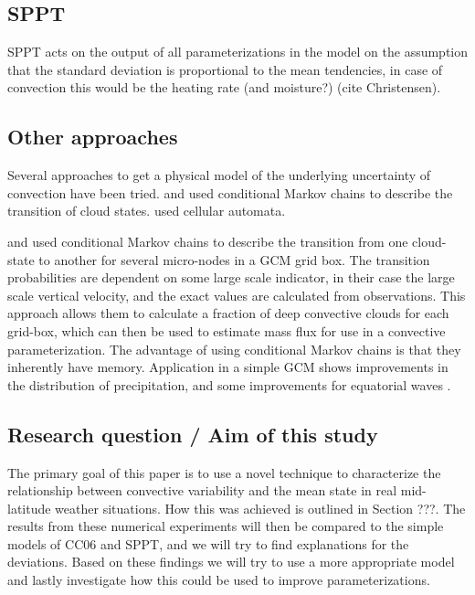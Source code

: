 \documentclass[a4paper, 12pt]{article}
\begin{document}
\subsection{SPPT}

SPPT acts on the output of all parameterizations in the model on the assumption that the standard deviation is proportional to the mean tendencies, in case of convection this would be the heating rate (and moisture?) (cite Christensen). 

\subsection{Other approaches}
Several approaches to get a physical model of the underlying uncertainty of convection have been tried. \cite{Dorrestijn2015} and \cite{Gottwald2016} used conditional Markov chains to describe the transition of cloud states. \cite{Bengtsson2013} used cellular automata.

\cite{Dorrestijn2015} and \cite{Gottwald2016} used conditional Markov chains to describe the transition from one cloud-state to another for several micro-nodes in a GCM grid box. The transition probabilities are dependent on some large scale indicator, in their case the large scale vertical velocity, and the exact values are calculated from observations. This approach allows them to calculate a fraction of deep convective clouds for each grid-box, which can then be used to estimate mass flux for use in a convective parameterization. The advantage of using conditional Markov chains is that they inherently have memory. Application in a simple GCM shows improvements in the distribution of precipitation, and some improvements for equatorial waves \citep{Dorrestijn2016}. 


\subsection{Research question / Aim of this study}

The primary goal of this paper is to use a novel technique to characterize the relationship between convective variability and the mean state in real mid-latitude weather situations. How this was achieved is outlined in Section ???. The results from these numerical experiments will then be compared to the simple models of CC06 and SPPT, and we will try to find explanations for the deviations. Based on these findings we will try to use a more appropriate model and lastly investigate how this could be used to improve parameterizations.
\end{document}
